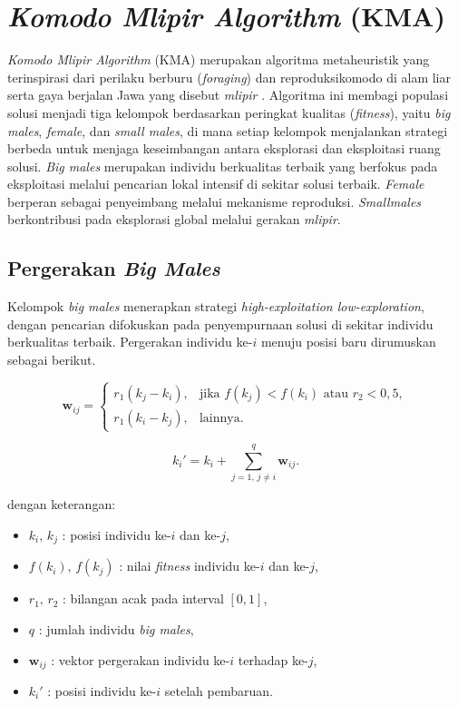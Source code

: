 \section{\textit{Komodo Mlipir Algorithm} (KMA)}\label{sec:kma}

\textit{Komodo Mlipir Algorithm} (KMA) merupakan algoritma metaheuristik yang terinspirasi dari perilaku berburu (\textit{foraging}) dan reproduksikomodo di alam liar serta gaya berjalan Jawa yang disebut \textit{mlipir} . Algoritma ini membagi populasi solusi menjadi tiga kelompok berdasarkan peringkat kualitas (\textit{fitness}), yaitu \textit{big males}, \textit{female}, dan \textit{small males}, di mana setiap kelompok menjalankan strategi berbeda untuk menjaga keseimbangan antara eksplorasi dan eksploitasi ruang solusi. \textit{Big males} merupakan individu berkualitas terbaik yang berfokus pada eksploitasi melalui pencarian lokal intensif di sekitar solusi terbaik. \textit{Female} berperan sebagai penyeimbang melalui mekanisme reproduksi. \textit{Smallmales} berkontribusi pada eksplorasi global melalui gerakan \textit{mlipir}.


    \subsection{Pergerakan \textit{Big Males}}\label{sub:big-males}
    Kelompok \textit{big males} menerapkan strategi \textit{high-exploitation low-exploration}, dengan pencarian difokuskan pada penyempurnaan solusi di sekitar individu berkualitas terbaik. Pergerakan individu ke-$i$ menuju posisi baru dirumuskan sebagai berikut.

    \begin{equation}
        \label{eq:bigmale-w}
        \mathbf{w}_{ij} =
        \begin{cases}
        r_1(k_j - k_i), & \text{jika } f(k_j) < f(k_i) \text{ atau } r_2 < 0{,}5,\\ r_1(k_i - k_j), & \text{lainnya.}
        \end{cases}
    \end{equation}

    \begin{equation}
    \label{eq:bigmale-k}
    k_i' = k_i + \sum_{j=1,\,j\neq i}^{q} \mathbf{w}_{ij}.
    \end{equation}

    dengan keterangan:
    \begin{itemize}
        \item $k_i,\,k_j$ : posisi individu ke-$i$ dan ke-$j$,
        \item $f(k_i),\,f(k_j)$ : nilai \textit{fitness} individu ke-$i$ dan ke-$j$,
        \item $r_1,\,r_2$ : bilangan acak pada interval $[0,1]$,
        \item $q$ : jumlah individu \textit{big males},
        \item $\mathbf{w}_{ij}$ : vektor pergerakan individu ke-$i$ terhadap ke-$j$,
        \item $k_i'$ : posisi individu ke-$i$ setelah pembaruan.
    \end{itemize}

